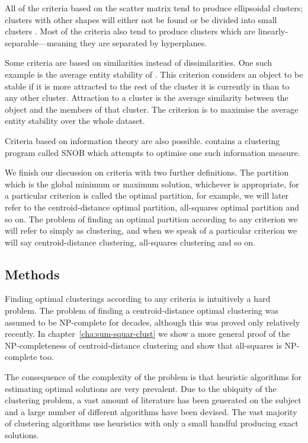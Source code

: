 \documentclass[a4paper]{report}
\begin{document}
All of the criteria based on the scatter matrix tend to produce ellipsoidal
clusters; clusters with other shapes will either not be found or be divided
into small clusters \citep{marriott1982optimization}.  Most of the criteria
also tend to produce clusters which are linearly-separable---meaning they are
separated by hyperplanes.

Some criteria are based on similarities instead of dissimilarities.  One such
example is the average entity stability of \citep{Rubin67optimal}.  This
criterion considers an object to be stable if it is more attracted to the rest
of the cluster it is currently in than to any other cluster.  Attraction to a
cluster is the average similarity between the object and the members of that
cluster.  The criterion is to maximise the average entity stability over the
whole dataset.

Criteria based on information theory are also possible.
\citet{wallace1968information} contains a clustering program called SNOB which
attempts to optimise one such information measure.

We finish our discussion on criteria with two further definitions.  The
partition which is the global minimum or maximum solution, whichever is
appropriate, for a particular criterion is called the optimal partition, for
example, we will later refer to the centroid-distance optimal partition,
all-squares optimal partition and so on.  The problem of finding an optimal
partition according to any criterion we will refer to simply as clustering,
and when we speak of a particular criterion we will say centroid-distance
clustering, all-squares clustering and so on.

\subsection{Methods}
\label{sec:methods}

Finding optimal clusterings according to any criteria is intuitively a hard
problem.  The problem of finding a centroid-distance optimal clustering was
assumed to be NP-complete for decades, although this was proved only
relatively recently\citep{aloise09exact}.  In
chapter~\ref{cha:sum-squar-clust} we show a more general proof of the
NP-completeness of centroid-distance clustering and show that all-squares is
NP-complete too.

The consequence of the complexity of the problem is that heuristic algorithms
for estimating optimal solutions are very prevalent.  Due to the ubiquity of
the clustering problem, a vast amount of literature has been generated on the
subject and a large number of different algorithms have been devised.  The
vast majority of clustering algorithms use heuristics with only a small
handful producing exact solutions.
\end{document}
